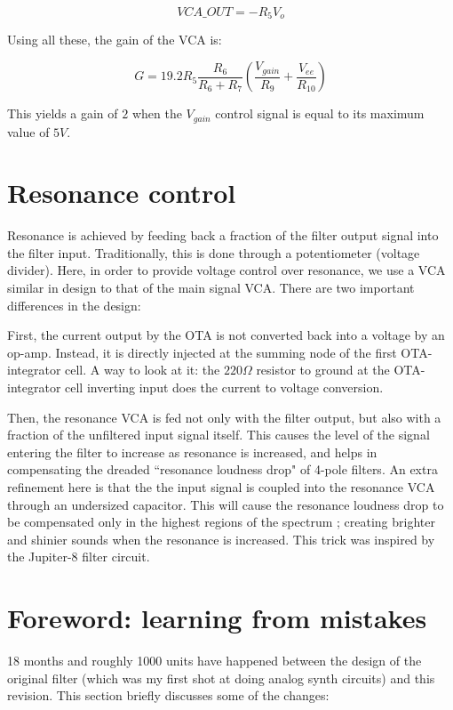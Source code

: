 \documentclass[a4paper,11pt]{article}
\begin{document}
\begin{equation}
VCA\_OUT = -R_5 V_o
\end{equation}

Using all these, the gain of the VCA is:

\begin{equation}
G = 19.2 R_5 \frac{R_6}{R_6 + R_7} \left(\frac{V_{gain}}{R_9} + \frac{V_{ee}}{R_{10}}\right)
\end{equation}

This yields a gain of $2$ when the $V_{gain}$ control signal is equal to its maximum value of $5V$.

\section{Resonance control}

Resonance is achieved by feeding back a fraction of the filter output signal into the filter input. Traditionally, this is done through a potentiometer (voltage divider). Here, in order to provide voltage control over resonance, we use a VCA similar in design to that of the main signal VCA. There are two important differences in the design:

First, the current output by the OTA is not converted back into a voltage by an op-amp. Instead, it is directly injected at the summing node of the first OTA-integrator cell. A way to look at it: the $220 \Omega$ resistor to ground at the OTA-integrator cell inverting input does the current to voltage conversion.

Then, the resonance VCA is fed not only with the filter output, but also with a fraction of the unfiltered input signal itself. This causes the level of the signal entering the filter to increase as resonance is increased, and helps in compensating the dreaded ``resonance loudness drop" of 4-pole filters. An extra refinement here is that the the input signal is coupled into the resonance VCA through an undersized capacitor. This will cause the resonance loudness drop to be compensated only in the highest regions of the spectrum ; creating brighter and shinier sounds when the resonance is increased. This trick was inspired by the Jupiter-8 filter circuit.

\section*{Foreword: learning from mistakes}

18 months and roughly 1000 units have happened between the design of the original filter (which was my first shot at doing analog synth circuits) and this revision. This section briefly discusses some of the changes:
\end{document}
